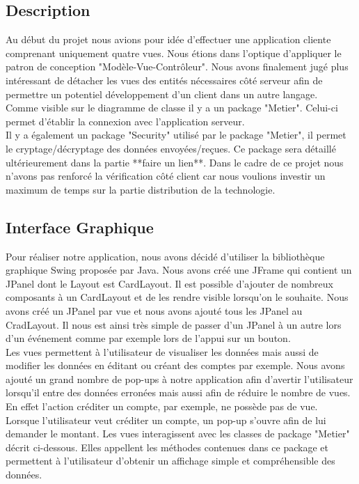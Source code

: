 \subsection{Description}

Au début du projet nous avions pour idée d'effectuer une application cliente comprenant uniquement quatre vues. 
Nous étions dans l'optique d'appliquer le patron de conception "Modèle-Vue-Contrôleur".
Nous avons finalement jugé plus intéressant de détacher les vues des entités nécessaires côté serveur afin de permettre un potentiel développement d'un client dans un autre langage. \\
Comme visible sur le diagramme de classe il y a un package "Metier".
Celui-ci permet d'établir la connexion avec l'application serveur.\\
Il y a également un package "Security" utilisé par le package "Metier", il permet le cryptage/décryptage des données envoyées/reçues.
Ce package sera détaillé ultérieurement dans la partie **faire un lien**.
Dans le cadre de ce projet nous n'avons pas renforcé la vérification côté client car nous voulions investir un maximum de temps sur la partie distribution de la technologie.

\subsection{Interface Graphique}

Pour réaliser notre application, nous avons décidé d'utiliser la bibliothèque graphique Swing proposée par Java. Nous avons créé une JFrame qui contient un JPanel dont le Layout est CardLayout. Il est possible d'ajouter de nombreux composants à un CardLayout et de les rendre visible lorsqu'on le souhaite.
 Nous avons créé un JPanel par vue et nous avons ajouté tous les JPanel au CradLayout. Il nous est ainsi très simple de passer d'un JPanel à un autre lors d'un événement comme par exemple lors de l'appui sur un bouton. \\
Les vues permettent à l'utilisateur de visualiser les données mais aussi de modifier les données en éditant ou créant des comptes par exemple. Nous avons ajouté un grand nombre de pop-ups à notre application afin d'avertir l'utilisateur lorsqu'il entre des données erronées mais aussi afin de réduire le nombre de vues. En effet l'action créditer un compte, par exemple, ne possède pas de vue.\\ 
Lorsque l'utilisateur veut créditer un compte, un pop-up s'ouvre afin de lui demander le montant. Les vues interagissent avec les classes de package "Metier" décrit ci-dessous. Elles appellent les méthodes contenues dans ce package et permettent à l'utilisateur d'obtenir un affichage simple et compréhensible des données.


